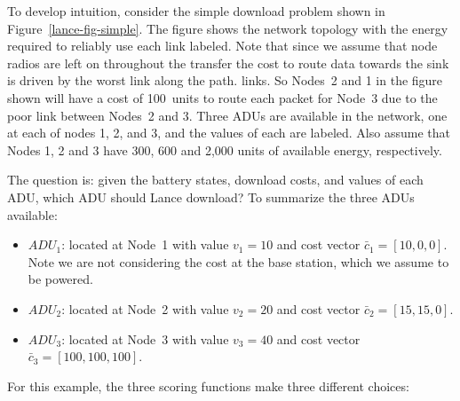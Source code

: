 To develop intuition, consider the simple download problem shown in
Figure~\ref{lance-fig-simple}. The figure shows the network topology with the
energy required to reliably use each link labeled. Note that since we assume
that node radios are left on throughout the transfer the cost to route data
towards the sink is driven by the worst link along the path. links. So
Nodes~2 and 1 in the figure shown will have a cost of 100~units to route each
packet for Node~3 due to the poor link between Nodes~2 and 3. Three ADUs are
available in the network, one at each of nodes 1, 2, and 3, and the values of
each are labeled. Also assume that Nodes 1, 2 and 3 have 300, 600 and 2,000
units of available energy, respectively.

The question is: given the battery states, download costs, and values of each
ADU, which ADU should Lance download? To summarize the three ADUs available:

\begin{itemize}

\item \textbf{$ADU_1$}: located at Node~1 with value $v_1 = 10$ and cost vector
$\bar{c}_1 = \left[10, 0, 0\right]$. Note we are not considering the cost at the base
station, which we assume to be powered.
\vspace*{-0.1in}
\item \textbf{$ADU_2$}: located at Node~2 with value $v_2 = 20$ and cost vector
$\bar{c}_2 = \left[15, 15, 0\right]$.
\vspace*{-0.1in}
\item \textbf{$ADU_3$}: located at Node~3 with value $v_3 = 40$ and cost vector
$\bar{c}_3 = \left[100, 100, 100\right]$.

\end{itemize}


For this example, the three scoring functions make three different choices:

